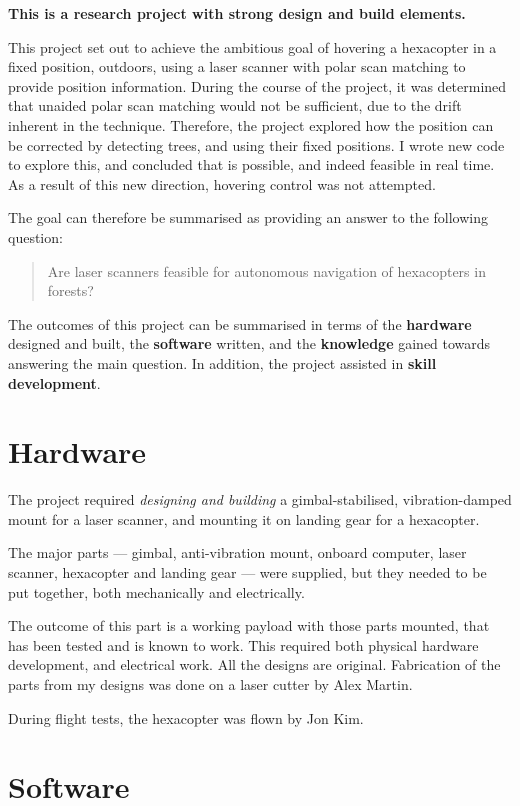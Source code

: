 \documentclass[12pt,oneside,a4paper]{book}
\begin{document}
\textbf{This is a research project with strong design and build elements.}

This project set out to achieve the ambitious goal of hovering a
hexacopter in a fixed position, outdoors, using a laser scanner with
polar scan matching to provide position information. During the course
of the project, it was determined that unaided polar scan matching
would not be sufficient, due to the drift inherent in the
technique. Therefore, the project explored how the position can be
corrected by detecting trees, and using their fixed positions. I wrote
new code to explore this, and concluded that is possible, and indeed
feasible in real time. As a result of this new direction, hovering
control was not attempted.

The goal can therefore be summarised as providing an answer to the
following question:
\begin{quote}
  Are laser scanners feasible for autonomous navigation of hexacopters in forests?
\end{quote}

The outcomes of this project can be summarised in terms of the
\textbf{hardware} designed and built, the \textbf{software} written,
and the \textbf{knowledge} gained towards answering the main
question. In addition, the project assisted in \textbf{skill
  development}.

\section{Hardware}
\label{sec:hardware-1}

The project required \emph{designing and building} a
gimbal-stabilised, vibration-damped mount for a laser scanner, and
mounting it on landing gear for a hexacopter.

The major parts --- gimbal, anti-vibration mount, onboard computer, laser
scanner, hexacopter and landing gear --- were supplied, but they needed
to be put together, both mechanically and electrically.

The outcome of this part is a working payload with those parts
mounted, that has been tested and is known to work. This required both
physical hardware development, and electrical work. All the designs
are original. Fabrication of the parts from my designs was done on a
laser cutter by Alex Martin.

During flight tests, the hexacopter was flown by Jon Kim.

\section{Software}
\label{sec:software-1}
\end{document}
